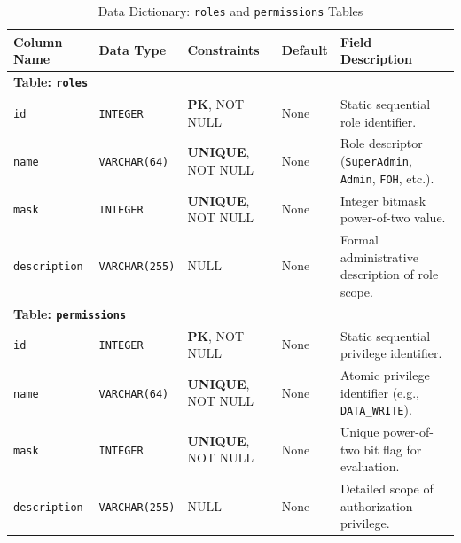 \begin{table}[htbp]
\centering
\caption{Data Dictionary: \texttt{roles} and \texttt{permissions} Tables}
\label{tab:dict_roles_perms}
\small
\begin{tabularx}{\textwidth}{llp{3.0cm}lX}
\toprule
\textbf{Column Name} & \textbf{Data Type} & \textbf{Constraints} & \textbf{Default} & \textbf{Field Description} \\
\midrule
\multicolumn{5}{l}{\textbf{Table: \texttt{roles}}} \\
\texttt{id} & \texttt{INTEGER} & \textbf{PK}, NOT NULL & None & Static sequential role identifier. \\
\texttt{name} & \texttt{VARCHAR(64)} & \textbf{UNIQUE}, NOT NULL & None & Role descriptor (\texttt{SuperAdmin}, \texttt{Admin}, \texttt{FOH}, etc.). \\
\texttt{mask} & \texttt{INTEGER} & \textbf{UNIQUE}, NOT NULL & None & Integer bitmask power-of-two value. \\
\texttt{description} & \texttt{VARCHAR(255)} & NULL & None & Formal administrative description of role scope. \\
\midrule
\multicolumn{5}{l}{\textbf{Table: \texttt{permissions}}} \\
\texttt{id} & \texttt{INTEGER} & \textbf{PK}, NOT NULL & None & Static sequential privilege identifier. \\
\texttt{name} & \texttt{VARCHAR(64)} & \textbf{UNIQUE}, NOT NULL & None & Atomic privilege identifier (e.g., \texttt{DATA\_WRITE}). \\
\texttt{mask} & \texttt{INTEGER} & \textbf{UNIQUE}, NOT NULL & None & Unique power-of-two bit flag for evaluation. \\
\texttt{description} & \texttt{VARCHAR(255)} & NULL & None & Detailed scope of authorization privilege. \\
\bottomrule
\end{tabularx}
\end{table}


